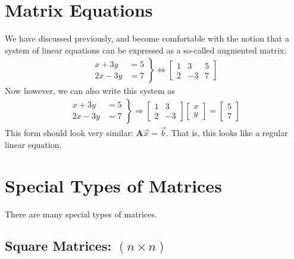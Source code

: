 \documentclass[11pt]{article}
\newcommand{\mat}[1]{\mathbf{#1}}
\newcommand{\vek}[1]{\vec{#1}}
\begin{document}
\section*{Matrix Equations}
We have discussed previously, and become comfortable with the notion that a system of linear equations can be expressed as a so-called augmented matrix:
\begin{align*}
\left.
\begin{aligned}
x + 3y &= 5
\\
2x - 3y &= 7
\end{aligned}
\right\}
\Leftrightarrow
\left[\begin{matrix}
1 & 3 & 5 \\
2 & -3 & 7
\end{matrix}\right]
\end{align*}
Now however, we can also write this system as
\begin{align*}
\left.
\begin{aligned}
x + 3y &= 5
\\
2x - 3y &= 7
\end{aligned}
\right\}
\Longrightarrow
\begin{bmatrix}
1 & 3 \\ 2 & -3
\end{bmatrix}
\begin{bmatrix}
x \\ y
\end{bmatrix}
=
\begin{bmatrix}
5 \\ 7
\end{bmatrix}
\end{align*}
This form should look very similar: $\mat{A} \vek{x} = \vek{b}$. That is, this looks like a regular linear equation.

\section*{Special Types of Matrices}
There are many special types of matrices.
\subsection*{Square Matrices: $(n \times n)$}
\end{document}
